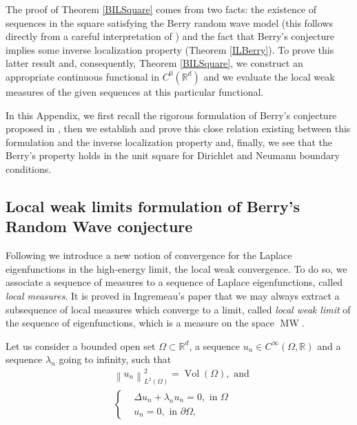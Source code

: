 \documentclass{amsart}
\theoremstyle{definition}
\theoremstyle{remark}
\def\RR{\mathbb{R}}
\DeclareMathOperator\Vol{Vol} \DeclareMathOperator\GL{GL} \DeclareMathOperator\orto{O}
\numberwithin{equation}{section}
\theoremstyle{definition}
\theoremstyle{remark}
\def\RR{\mathbb{R}}
\DeclareMathOperator\MW{MW}
\begin{document}
The proof of Theorem \ref{BILSquare} comes from two facts: the existence of sequences in the square satisfying the Berry random wave model (this follows directly from a careful interpretation of \cite{Ingremeau}) and the fact that Berry's conjecture implies some inverse localization property (Theorem \ref{ILBerry}). To prove this latter result and, consequently, Theorem \ref{BILSquare}, we construct an appropriate continuous functional in $C^0\left(\RR^d\right)$ and we evaluate the local weak measures of the given sequences at this particular functional.

 In this Appendix, we first recall the rigorous formulation of Berry's conjecture proposed in \cite{Ingremeau}, then we establish and prove this close relation existing between this formulation and the inverse localization property and, finally, we see that the Berry's property holds in the unit square for Dirichlet and Neumann boundary conditions. 
 \subsection{Local weak limits formulation of Berry's Random Wave conjecture}
 Following \cite{Ingremeau} we introduce a new notion of convergence for the Laplace eigenfunctions in the high-energy limit, the local weak convergence. To do so, we associate a sequence of measures to a sequence of Laplace eigenfunctions, called \emph{local measures}. It is proved in Ingremeau's paper that we may always extract a subsequence of local measures which converge to a limit, called \emph{local weak limit} of the sequence of eigenfunctions, which is a measure on the space $\MW$. 
 
 Let us consider a bounded open set $\Omega\subset \mathbb{R}^d$, a sequence $u_n\in C^\infty(\Omega,\mathbb{R})$ and a sequence $\lambda_n$ going to infinity, such that \begin{equation}\label{eigeneq}
	\begin{aligned}
		&\left\|u_n\right\|_{L^2(\Omega)}^2=\Vol(\Omega),\text{ and }\\
		&\left\{\begin{aligned}
			&\Delta u_n+\lambda_{n}u_n=0, \text{ in }\Omega\\
			&u_n=0,\text{ in } \partial\Omega,
		\end{aligned}\right.
	\end{aligned}
\end{equation}
\end{document}
